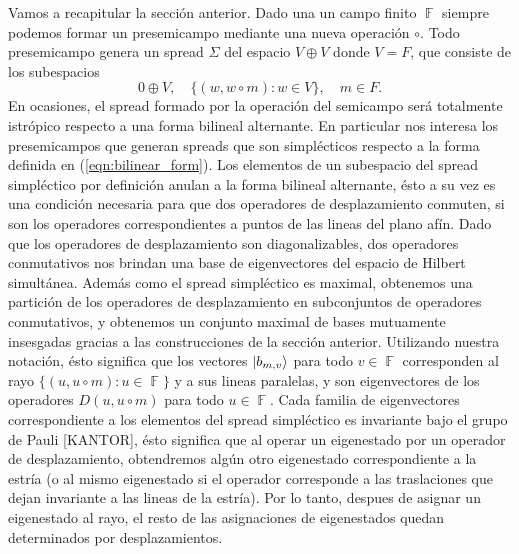 \documentclass[a4paper]{report}
\DeclareMathOperator{\F}{\mathbb{F}}
\begin{document}
  Vamos a recapitular la sección anterior. Dado una un campo
  finito $\F$ siempre podemos formar un presemicampo mediante
  una nueva operación $\circ$. Todo presemicampo genera un
  spread $\Sigma$ del espacio $V \oplus V$ donde $V = F$, que
  consiste de los subespacios
  \[
    0 \oplus V,
    \quad
    \{(w, w \circ m) : w \in V\}, 
    \quad m \in F.
  \] 
  En ocasiones, el spread formado por la operación del
  semicampo será totalmente istrópico respecto a una forma
  bilineal alternante. En particular nos interesa los
  presemicampos que generan spreads que son simplécticos
  respecto a la forma definida en (\ref{eqn:bilinear_form}).
  Los elementos de un subespacio del spread simpléctico por
  definición anulan a la forma bilineal alternante, ésto a
  su vez es una condición necesaria para que dos operadores
  de desplazamiento conmuten, si son los operadores
  correspondientes a puntos de las lineas del plano afín.
  Dado que los operadores de desplazamiento son
  diagonalizables, dos operadores conmutativos nos brindan
  una base de eigenvectores del espacio de Hilbert
  simultánea. Además como el spread simpléctico es maximal,
  obtenemos una partición de los operadores de
  desplazamiento en subconjuntos de operadores conmutativos,
  y obtenemos un conjunto maximal de bases mutuamente
  insesgadas gracias a las construcciones de la sección
  anterior. Utilizando nuestra notación, ésto significa que
  los vectores $\ket{b_{m,v}}$ para todo $v \in \F$
  corresponden al rayo $\{(u, u \circ m) : u \in \F\}$ y a
  sus lineas paralelas, y son eigenvectores de los
  operadores $D(u, u \circ m)$ para todo $u \in \F$. Cada
  familia de eigenvectores correspondiente a los elementos
  del spread simpléctico es invariante bajo el grupo de
  Pauli [KANTOR], ésto significa que al operar un
  eigenestado por un operador de desplazamiento, obtendremos
  algún otro eigenestado correspondiente a la estría (o al
  mismo eigenestado si el operador corresponde a las
  traslaciones que dejan invariante a las lineas de la
  estría). Por lo tanto, despues de asignar un eigenestado
  al rayo, el resto de las asignaciones de eigenestados
  quedan determinados por desplazamientos.
\end{document}

